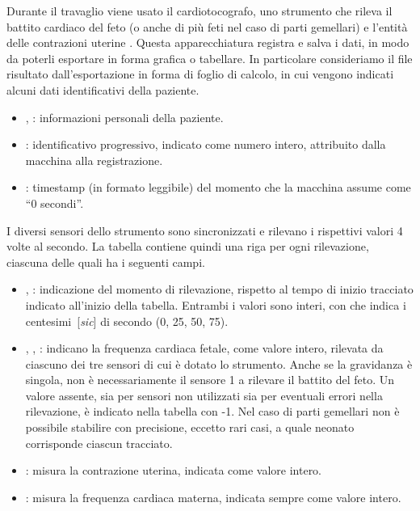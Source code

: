 Durante il travaglio viene usato il cardiotocografo, uno strumento che rileva il battito cardiaco del feto (o anche di più feti nel caso di parti gemellari) e l'entità delle contrazioni uterine \cite{Ayr18}.
Questa apparecchiatura registra e salva i dati, in modo da poterli esportare in forma grafica o tabellare.
In particolare consideriamo il file risultato dall'esportazione in forma di foglio di calcolo, in cui vengono indicati alcuni dati identificativi della paziente.

\begin{itemize}
\item {}, : informazioni personali della paziente.
\item {}: identificativo progressivo, indicato come numero intero, attribuito dalla macchina alla registrazione.
\item {}: timestamp (in formato leggibile) del momento che la macchina assume come \enquote{0 secondi}.
\end{itemize}

I diversi sensori dello strumento sono sincronizzati e rilevano i rispettivi valori 4 volte al secondo.
La tabella contiene quindi una riga per ogni rilevazione, ciascuna delle quali ha i seguenti campi.

\begin{itemize}
\item {}, : indicazione del momento di rilevazione, rispetto al tempo di inizio tracciato indicato all'inizio della tabella. Entrambi i valori sono interi, con  che indica i centesimi~[\textit{sic}] di secondo (0, 25, 50, 75).
\item {}, , : indicano la frequenza cardiaca fetale, come valore intero, rilevata da ciascuno dei tre sensori di cui è dotato lo strumento. Anche se la gravidanza è singola, non è necessariamente il sensore 1 a rilevare il battito del feto. Un valore assente, sia per sensori non utilizzati sia per eventuali errori nella rilevazione, è indicato nella tabella con -1.
Nel caso di parti gemellari non è possibile stabilire con precisione, eccetto rari casi, a quale neonato corrisponde ciascun tracciato.
\item {}: misura la contrazione uterina, indicata come valore intero.
\item {}: misura la frequenza cardiaca materna, indicata sempre come valore intero.
\end{itemize}

